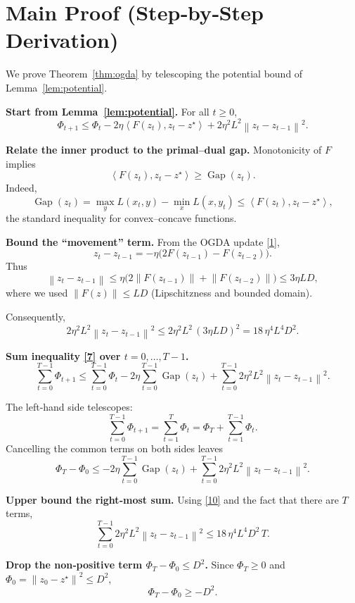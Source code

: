 \documentclass{article}
\newcommand{\norm}[1]{\left\lVert#1\right\rVert}
\newcommand{\inner}[2]{\left\langle #1,#2\right\rangle}
\newcommand{\gap}{\operatorname{Gap}}
\begin{document}
\section*{Main Proof (Step‑by‑Step Derivation)}
We prove Theorem~\ref{thm:ogda} by telescoping the potential bound of Lemma~\ref{lem:potential}.

\begin{enumerate}[label={[Step \arabic*]}]
\item \textbf{Start from Lemma~\ref{lem:potential}.} For all $t\ge0$,
\[
\Phi_{t+1}\le\Phi_t-2\eta\inner{F(z_t)}{z_t-z^\star}
+2\eta^{2}L^{2}\norm{z_t-z_{t-1}}^{2}.
\tag{7}
\]

\item \textbf{Relate the inner product to the primal–dual gap.}
Monotonicity of $F$ implies
\[
\inner{F(z_t)}{z_t-z^\star}\ge \gap(z_t).
\tag{8}
\]
Indeed,
\[
\gap(z_t)=\max_{y}L(x_t,y)-\min_{x}L(x,y_t)
       \le\inner{F(z_t)}{z_t-z^\star},
\]
the standard inequality for convex–concave functions.

\item \textbf{Bound the “movement” term.}
From the OGDA update \eqref{1},
\[
z_t-z_{t-1}= -\eta\bigl(2F(z_{t-1})-F(z_{t-2})\bigr).
\]
Thus
\[
\norm{z_t-z_{t-1}}\le \eta\bigl(2\norm{F(z_{t-1})}+\norm{F(z_{t-2})}\bigr)
\le 3\eta L D,
\tag{9}
\]
where we used $\norm{F(z)}\le L D$ (Lipschitzness and bounded domain).

Consequently,
\[
2\eta^{2}L^{2}\norm{z_t-z_{t-1}}^{2}\le 2\eta^{2}L^{2}\,(3\eta L D)^{2}
=18\,\eta^{4}L^{4}D^{2}.
\tag{10}
\]

\item \textbf{Sum inequality \eqref{7} over $t=0,\dots,T-1$.}
\[
\sum_{t=0}^{T-1}\Phi_{t+1}
\le\sum_{t=0}^{T-1}\Phi_t
-2\eta\sum_{t=0}^{T-1}\gap(z_t)
+\sum_{t=0}^{T-1}2\eta^{2}L^{2}\norm{z_t-z_{t-1}}^{2}.
\tag{11}
\]

The left‑hand side telescopes:
\[
\sum_{t=0}^{T-1}\Phi_{t+1}= \sum_{t=1}^{T}\Phi_t
= \Phi_T+\sum_{t=1}^{T-1}\Phi_t .
\]
Cancelling the common terms on both sides leaves
\[
\Phi_T-\Phi_0\le
-2\eta\sum_{t=0}^{T-1}\gap(z_t)
+ \sum_{t=0}^{T-1}2\eta^{2}L^{2}\norm{z_t-z_{t-1}}^{2}.
\tag{12}
\]

\item \textbf{Upper bound the right‑most sum.}
Using \eqref{10} and the fact that there are $T$ terms,
\[
\sum_{t=0}^{T-1}2\eta^{2}L^{2}\norm{z_t-z_{t-1}}^{2}
\le 18\,\eta^{4}L^{4}D^{2}\,T.
\tag{13}
\]

\item \textbf{Drop the non‑positive term $\Phi_T-\Phi_0\le D^{2}$.}
Since $\Phi_T\ge0$ and $\Phi_0=\norm{z_0-z^\star}^{2}\le D^{2}$,
\[
\Phi_T-\Phi_0\ge -D^{2}.
\tag{14}
\]


\end{enumerate}
\end{document}
